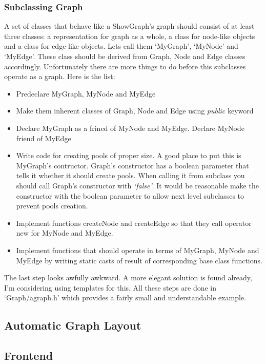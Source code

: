 \documentclass[11pt,twoside,a4paper]{article}
\begin{document}
\subsubsection{Subclassing Graph}
A set of classes that behave like a ShowGraph's graph should consist of at least three classes: a representation for graph as a whole, a class for node-like objects and a class for edge-like objects. Lets call them `MyGraph', `MyNode' and `MyEdge'. These class should be derived from Graph, Node and Edge classes accordingly. Unfortunately there are more things to do before this subclasses operate as a graph. Here is the list:
\begin{itemize}
\item Predeclare MyGraph, MyNode and MyEdge
\item Make them inherent classes of Graph, Node and Edge using \emph{public} keyword
\item Declare MyGraph as a frined of MyNode and MyEdge. Declare MyNode friend of MyEdge
\item Write code for creating pools of proper size. A good place to put this is MyGraph's contructor. Graph's constructor has a boolean parameter that tells it whether it should create pools. When calling it from subclass you should call Graph's constructor with \emph{`false'}. It would be reasonable make the constructor with the boolean parameter to allow next level subclasses to prevent pools creation.
\item Implement functions createNode and createEdge so that they call operator new for MyNode and MyEdge.
\item Implement functions that should operate in terms of MyGraph, MyNode and MyEdge by writing static casts of result of corresponding base class functions.
\end{itemize}

The last step looks awfully awkward. A more elegant solution is found already, I'm considering using templates for this. All these steps are done in `Graph/agraph.h' which provides a fairly small and understandable  example.

\subsection{Automatic Graph Layout}


\subsection{Frontend}
\end{document}
